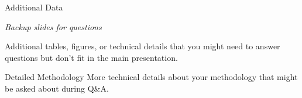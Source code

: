 \documentclass[aspectratio=169]{beamer}
\begin{document}
	
	\appendix
	
	\begin{frame}{Additional Data}
		\begin{center}
			\textit{Backup slides for questions}
		\end{center}
		
		Additional tables, figures, or technical details that you might need to answer questions but don't fit in the main presentation.
	\end{frame}
	
	\begin{frame}{Detailed Methodology}
		More technical details about your methodology that might be asked about during Q\&A.
	\end{frame}
	
\end{document}
